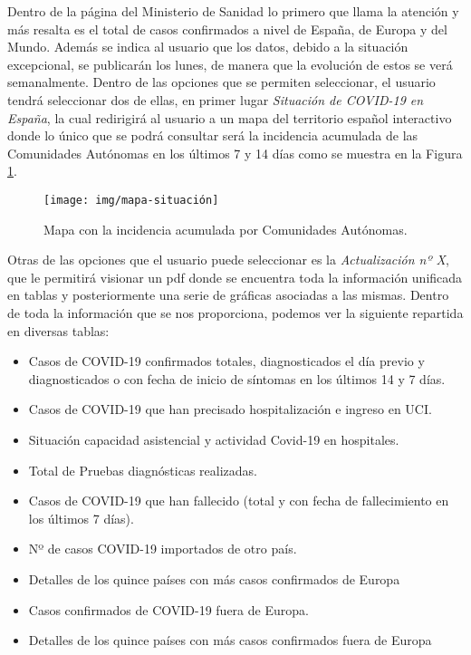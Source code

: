 Dentro de la página del Ministerio de Sanidad lo primero que llama la atención y más resalta es el total de casos confirmados a nivel de España, de Europa y del Mundo. Además se indica al usuario que los datos, debido a la situación excepcional, se publicarán los lunes, de manera que la evolución de estos se verá semanalmente. Dentro de las opciones que se permiten seleccionar, el usuario tendrá seleccionar dos de ellas, en primer lugar \textit{Situación de COVID-19 en España}, la cual redirigirá al usuario a un mapa del territorio español interactivo donde lo único que se podrá consultar será la incidencia acumulada de las Comunidades Autónomas en los últimos 7 y 14 días como se muestra en la Figura \ref{fig:mapa-situacion}.

\begin{figure}[H]
	\centering
	\texttt{[image: img/mapa-situación]}
	\caption{Mapa con la incidencia acumulada por Comunidades Autónomas.}
	\label{fig:mapa-situacion}
\end{figure}

Otras de las opciones que el usuario puede seleccionar es la \textit{Actualización nº X}, que le permitirá visionar un pdf donde se encuentra toda la información unificada en tablas y posteriormente una serie de gráficas asociadas a las mismas. Dentro de toda la información que se nos proporciona, podemos ver la siguiente repartida en diversas tablas:

\begin{itemize}
	\item Casos de COVID-19 confirmados totales, diagnosticados el día previo y diagnosticados o con fecha de inicio de síntomas en los últimos 14 y 7 días.
	\item Casos de COVID-19 que han precisado hospitalización e ingreso en UCI.
	\item Situación capacidad asistencial y actividad Covid-19 en hospitales.
	\item Total de Pruebas diagnósticas realizadas.
	\item Casos de COVID-19 que han fallecido (total y con fecha de fallecimiento en los últimos 7 días).
	\item Nº de casos COVID-19 importados de otro país.
	\item Detalles de los quince países con más casos confirmados de Europa
	\item Casos confirmados de COVID-19 fuera de Europa.
	\item Detalles de los quince países con más casos confirmados fuera de Europa
\end{itemize}

